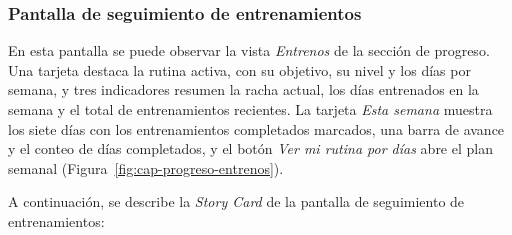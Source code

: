 \subsubsection{Pantalla de seguimiento de entrenamientos}

En esta pantalla se puede observar la vista \emph{Entrenos} de la sección de
progreso. Una tarjeta destaca la rutina activa, con su objetivo, su nivel y los
días por semana, y tres indicadores resumen la racha actual, los días
entrenados en la semana y el total de entrenamientos recientes. La tarjeta
\emph{Esta semana} muestra los siete días con los entrenamientos completados
marcados, una barra de avance y el conteo de días completados, y el botón
\emph{Ver mi rutina por días} abre el plan semanal
(Figura~\ref{fig:cap-progreso-entrenos}).


A continuación, se describe la \emph{Story Card} de la pantalla de seguimiento de entrenamientos:


